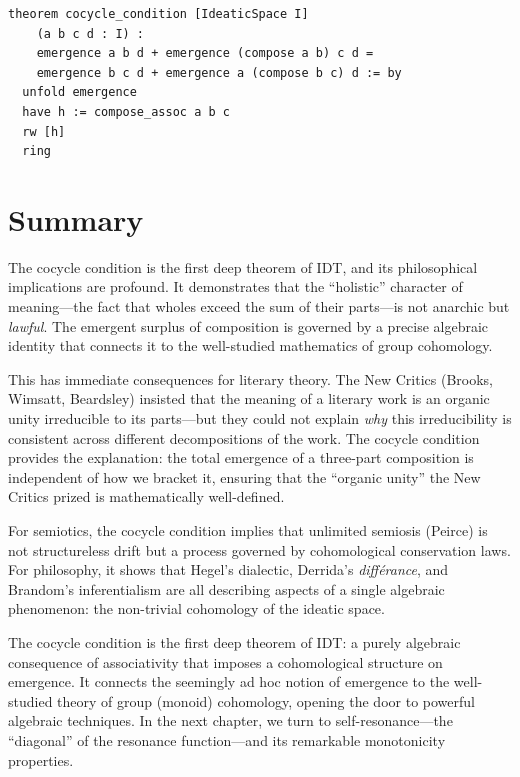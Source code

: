 \begin{lstlisting}[language=Lean4, caption={The cocycle condition
derived from associativity}]
theorem cocycle_condition [IdeaticSpace I]
    (a b c d : I) :
    emergence a b d + emergence (compose a b) c d =
    emergence b c d + emergence a (compose b c) d := by
  unfold emergence
  have h := compose_assoc a b c
  rw [h]
  ring
\end{lstlisting}

\section{Summary}

\begin{interpretation}\label{interp:ch2:cocycle_as_algebra}
The cocycle condition is the first deep theorem of IDT, and its
philosophical implications are profound. It demonstrates that the
``holistic'' character of meaning---the fact that wholes exceed
the sum of their parts---is not anarchic but \emph{lawful}. The
emergent surplus of composition is governed by a precise algebraic
identity that connects it to the well-studied mathematics of group
cohomology.

This has immediate consequences for literary theory. The New Critics
(Brooks, Wimsatt, Beardsley) insisted that the meaning of a literary
work is an organic unity irreducible to its parts---but they could not
explain \emph{why} this irreducibility is consistent across different
decompositions of the work. The cocycle condition provides the
explanation: the total emergence of a three-part composition is
independent of how we bracket it, ensuring that the ``organic unity''
the New Critics prized is mathematically well-defined.

For semiotics, the cocycle condition implies that unlimited semiosis
(Peirce) is not structureless drift but a process governed by
cohomological conservation laws. For philosophy, it shows that
Hegel's dialectic, Derrida's \emph{diff\'erance}, and Brandom's
inferentialism are all describing aspects of a single algebraic
phenomenon: the non-trivial cohomology of the ideatic space.
\end{interpretation}

The cocycle condition is the first deep theorem of IDT: a purely algebraic
consequence of associativity that imposes a cohomological structure on
emergence. It connects the seemingly ad hoc notion of emergence to the
well-studied theory of group (monoid) cohomology, opening the door to
powerful algebraic techniques. In the next chapter, we turn to
self-resonance---the ``diagonal'' of the resonance function---and its
remarkable monotonicity properties.



